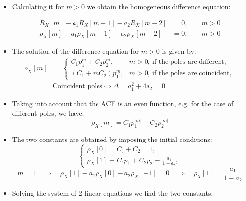 \begin{itemize}
\item Calculating it for \(m>0\) we obtain the homogeneous difference equation:

\begin{align*}
R_{X}[m] - a_{1} R_{X}[m-1] - a_{2} R_{X}[m-2] &= 0, \qquad m>0 \\[6pt]
\rho_{X}[m] - a_{1} \rho_{X}[m-1] - a_{2} \rho_{X}[m-2] &= 0, \qquad m>0
\end{align*}


\item The solution of the difference equation for \(m>0\) is given by:
\begin{align*}
\rho_{X}[m] &=
\begin{cases}
C_{1} p_{1}^{m} + C_{2} p_{2}^{m}, & m>0,\ \text{if the poles are different},\\[4pt]
\left(C_{1} + m C_{2}\right) p_{1}^{m}, & m>0,\ \text{if the poles are coincident},
\end{cases}
\\[6pt]
&\text{Coincident poles} \iff \Delta = a_{1}^{2} + 4a_{2} = 0
\end{align*}
\item Taking into account that the ACF is an even function, e.g. for the case of different poles, we have:
\[
\rho_X[m]=C_1p_1^{|m|}+C_2p_2^{|m|}
\]
\item The two constants are obtained by imposing the initial conditions:
\[
\begin{cases}
\rho_{X}[0] = C_{1} + C_{2} = 1, \\[4pt]
\rho_{X}[1] = C_{1}p_{1} + C_{2}p_{2}
            = \frac{a_{1}}{1-a_{2}},
\end{cases}\]
\[
m=1 \quad \Longrightarrow \quad \rho_X[1]-a_1\rho_X[0]-a_2\rho_X[-1]=0 \quad \Longrightarrow\quad\rho_X[1]=\frac{a_1}{1-a_2}
\]
\item Solving the system of 2 linear equations we find the two constants:



\end{itemize}
